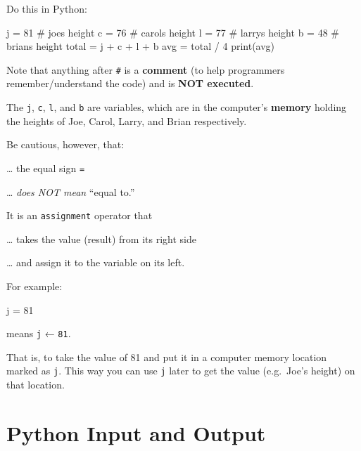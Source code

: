 \documentclass[
  letterpaper,
]{scrbook}
\newenvironment{Shaded}{\begin{snugshade}}{\end{snugshade}}
\newcommand{\BuiltInTok}[1]{\textcolor[rgb]{0.00,0.23,0.31}{#1}}
\newcommand{\CommentTok}[1]{\textcolor[rgb]{0.37,0.37,0.37}{#1}}
\newcommand{\DecValTok}[1]{\textcolor[rgb]{0.68,0.00,0.00}{#1}}
\newcommand{\NormalTok}[1]{\textcolor[rgb]{0.00,0.23,0.31}{#1}}
\newcommand{\OperatorTok}[1]{\textcolor[rgb]{0.37,0.37,0.37}{#1}}
\begin{document}
Do this in Python:

\begin{Shaded}
\begin{Highlighting}[]
\NormalTok{j }\OperatorTok{=} \DecValTok{81}  \CommentTok{\# joe\textquotesingle{}s height}
\NormalTok{c }\OperatorTok{=} \DecValTok{76}  \CommentTok{\# carol\textquotesingle{}s height}
\NormalTok{l }\OperatorTok{=} \DecValTok{77}  \CommentTok{\# larry\textquotesingle{}s height}
\NormalTok{b }\OperatorTok{=} \DecValTok{48}  \CommentTok{\# brian\textquotesingle{}s height}
\NormalTok{total }\OperatorTok{=}\NormalTok{ j }\OperatorTok{+}\NormalTok{ c }\OperatorTok{+}\NormalTok{ l }\OperatorTok{+}\NormalTok{ b}
\NormalTok{avg }\OperatorTok{=}\NormalTok{ total }\OperatorTok{/} \DecValTok{4}
\BuiltInTok{print}\NormalTok{(avg)}
\end{Highlighting}
\end{Shaded}

Note that anything after \texttt{\#} is a \textbf{comment} (to help
programmers remember/understand the code) and is \textbf{NOT executed}.

The \texttt{j}, \texttt{c}, \texttt{l}, and \texttt{b} are variables,
which are in the computer's \textbf{memory} holding the heights of Joe,
Carol, Larry, and Brian respectively.

Be cautious, however, that:

\ldots{} the equal sign \texttt{=}

\ldots{} \emph{does NOT mean} ``equal to.''

It is an \texttt{assignment} operator that

\ldots{} takes the value (result) from its right side

\ldots{} and assign it to the variable on its left.

For example:

\begin{Shaded}
\begin{Highlighting}[]
\NormalTok{j }\OperatorTok{=} \DecValTok{81}
\end{Highlighting}
\end{Shaded}

means \texttt{j} ← \texttt{81}.

That is, to take the value of 81 and put it in a computer memory
location marked as \texttt{j}. This way you can use \texttt{j} later to
get the value (e.g.~Joe's height) on that location.

\chapter*{Python Input and Output}\label{ch-lab-python-io}
\end{document}
